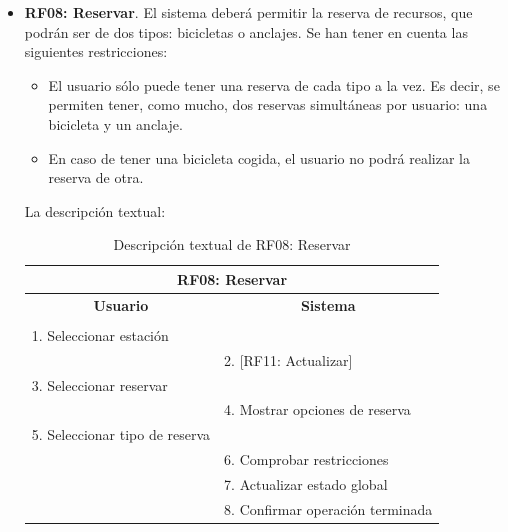 \begin{itemize}
	\FloatBarrier
	\item \textbf{RF08: Reservar}. El sistema deberá permitir la reserva de recursos, que podrán ser de dos tipos: bicicletas o anclajes. Se han tener en cuenta las siguientes restricciones:
	\begin{itemize}
		\item El usuario sólo puede tener una reserva de cada tipo a la vez. Es decir, se permiten tener, como mucho, dos reservas simultáneas por usuario: una bicicleta y un anclaje.
		\item En caso de tener una bicicleta cogida, el usuario no podrá realizar la reserva de otra.
	\end{itemize}
	
	La descripción textual:
	\begin{table}[h]
		\centering	
		\begin{tabular}{|l|l|}
			\hline
			\multicolumn{2}{|c|}{\textbf{RF08: Reservar}} \\ \hline
			\multicolumn{1}{|c|}{\textbf{Usuario}} & \multicolumn{1}{c|}{\textbf{Sistema}} \\ \hline
			[Pto. inclusión: RF02: Loguear usuario] &\\ \hline
			1. Seleccionar estación &\\ \hline
			& 2. [RF11: Actualizar] \\ \hline
			3. Seleccionar reservar &\\ \hline
			& 4. Mostrar opciones de reserva \\ \hline
			5. Seleccionar tipo de reserva &\\ \hline
			& 6. Comprobar restricciones \\ \hline
			& 7. Actualizar estado global \\ \hline
			& 8. Confirmar operación terminada \\ \hline 
		\end{tabular}
		\caption{Descripción textual de RF08: Reservar}
		\label{tab:tablaDescTextualRF08}
	\end{table}
	

\end{itemize}
